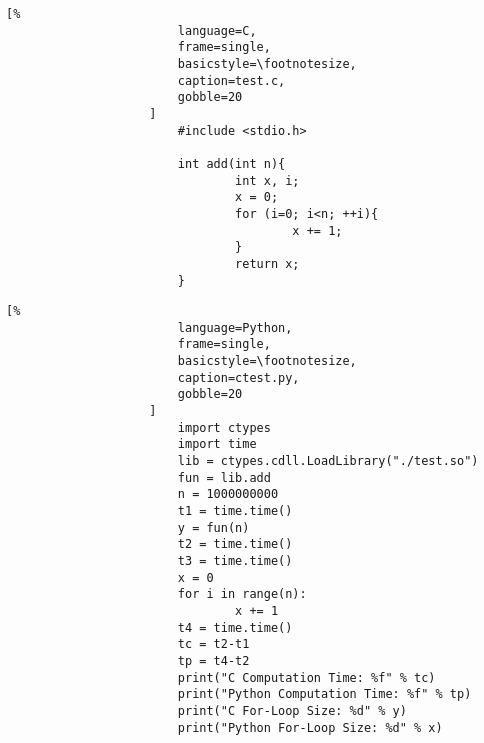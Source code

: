 \documentclass[crop=false,class=book,oneside]{standalone}
\begin{document}
                \begin{minipage}[t]{.48\textwidth}
                    \centering
                    \begin{lstlisting}[%
                        language=C,
                        frame=single,
                        basicstyle=\footnotesize,
                        caption=test.c,
                        gobble=20
                    ]
                        #include <stdio.h>
                        
                        int add(int n){
                                int x, i;
                                x = 0;
                                for (i=0; i<n; ++i){
                                        x += 1;
                                }
                                return x;
                        }
                    \end{lstlisting}
                \end{minipage}\hfill
                \begin{minipage}[t]{.48\textwidth}
                    \centering
                    \begin{lstlisting}[%
                        language=Python,
                        frame=single,
                        basicstyle=\footnotesize,
                        caption=ctest.py,
                        gobble=20
                    ]
                        import ctypes
                        import time
                        lib = ctypes.cdll.LoadLibrary("./test.so")
                        fun = lib.add
                        n = 1000000000
                        t1 = time.time()
                        y = fun(n)
                        t2 = time.time()
                        t3 = time.time()
                        x = 0
                        for i in range(n):
                                x += 1
                        t4 = time.time()
                        tc = t2-t1
                        tp = t4-t2
                        print("C Computation Time: %f" % tc)
                        print("Python Computation Time: %f" % tp)
                        print("C For-Loop Size: %d" % y)
                        print("Python For-Loop Size: %d" % x)
                    \end{lstlisting}
                \end{minipage}
\end{document}
